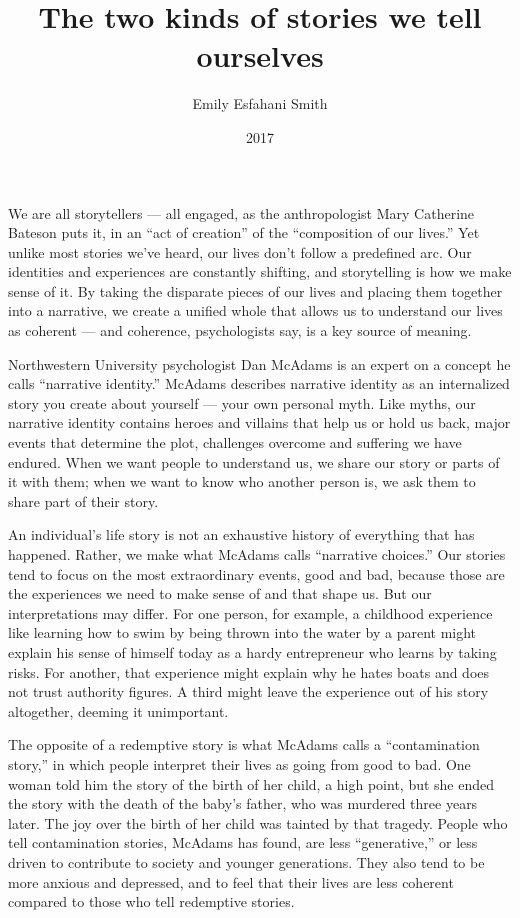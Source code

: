 \documentclass[10pt,a4paper]{article}
\begin{document}
\title{The two kinds of stories we tell ourselves}
\date{2017}
\author{Emily Esfahani Smith}
\maketitle
    
\thispagestyle{plain}
\setcounter{page}{1}
\linenumbers We are all storytellers — all engaged, as the anthropologist Mary Catherine Bateson puts it, in an “act of creation” of the “composition of our lives.” Yet unlike most stories we’ve heard, our lives don’t follow a predefined arc. Our identities and experiences are constantly shifting, and storytelling is how we make sense of it. By taking the disparate pieces of our lives and placing them together into a narrative, we create a unified whole that allows us to understand our lives as coherent — and coherence, psychologists say, is a key source of meaning.

Northwestern University psychologist Dan McAdams is an expert on a concept he calls “narrative identity.” McAdams describes narrative identity as an internalized story you create about yourself — your own personal myth. Like myths, our narrative identity contains heroes and villains that help us or hold us back, major events that determine the plot, challenges overcome and suffering we have endured. When we want people to understand us, we share our story or parts of it with them; when we want to know who another person is, we ask them to share part of their story.

An individual’s life story is not an exhaustive history of everything that has happened. Rather, we make what McAdams calls “narrative choices.” Our stories tend to focus on the most extraordinary events, good and bad, because those are the experiences we need to make sense of and that shape us. But our interpretations may differ. For one person, for example, a childhood experience like learning how to swim by being thrown into the water by a parent might explain his sense of himself today as a hardy entrepreneur who learns by taking risks. For another, that experience might explain why he hates boats and does not trust authority figures. A third might leave the experience out of his story altogether, deeming it unimportant.

The opposite of a redemptive story is what McAdams calls a “contamination story,” in which people interpret their lives as going from good to bad. One woman told him the story of the birth of her child, a high point, but she ended the story with the death of the baby’s father, who was murdered three years later. The joy over the birth of her child was tainted by that tragedy. People who tell contamination stories, McAdams has found, are less “generative,” or less driven to contribute to society and younger generations. They also tend to be more anxious and depressed, and to feel that their lives are less coherent compared to those who tell redemptive stories.
\end{document}
